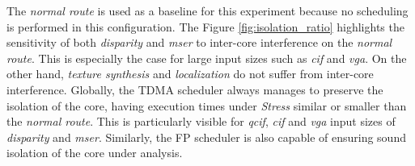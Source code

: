The \emph{normal route} is used as a baseline for this experiment
because no scheduling is performed in this configuration.
The Figure \ref{fig:isolation_ratio} highlights the sensitivity of both
\emph{disparity} and \emph{mser} to inter-core interference on the
\emph{normal route}. This is especially the case for large input sizes
such as \emph{cif} and \emph{vga}. On the other hand, \emph{texture
synthesis} and \emph{localization} do not suffer from inter-core
interference.
Globally, the TDMA scheduler always manages to preserve the isolation of
the core, having execution times under \emph{Stress} similar or smaller than the \emph{normal route}. This is particularly visible for \emph{qcif}, \emph{cif} and \emph{vga} input sizes of \emph{disparity} and \emph{mser}.
Similarly, the FP scheduler is also capable of ensuring sound
isolation of the core under analysis.
